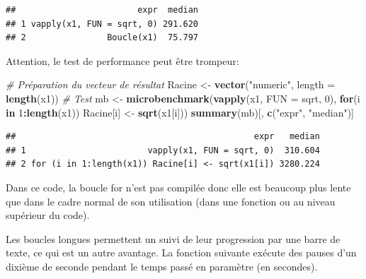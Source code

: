 \documentclass[
  12pt,
  french,
  a4paper,
  extrafontsizes,onecolumn,openright
  ]{memoir}
\newenvironment{Shaded}{\begin{snugshade}}{\end{snugshade}}
\newcommand{\CommentTok}[1]{\textcolor[rgb]{0.56,0.35,0.01}{\textit{#1}}}
\newcommand{\ControlFlowTok}[1]{\textcolor[rgb]{0.13,0.29,0.53}{\textbf{#1}}}
\newcommand{\DataTypeTok}[1]{\textcolor[rgb]{0.13,0.29,0.53}{#1}}
\newcommand{\DecValTok}[1]{\textcolor[rgb]{0.00,0.00,0.81}{#1}}
\newcommand{\KeywordTok}[1]{\textcolor[rgb]{0.13,0.29,0.53}{\textbf{#1}}}
\newcommand{\NormalTok}[1]{#1}
\newcommand{\OperatorTok}[1]{\textcolor[rgb]{0.81,0.36,0.00}{\textbf{#1}}}
\newcommand{\StringTok}[1]{\textcolor[rgb]{0.31,0.60,0.02}{#1}}
\newlength{\rf}
\begin{document}
\begin{verbatim}
##                        expr  median
## 1 vapply(x1, FUN = sqrt, 0) 291.620
## 2                Boucle(x1)  75.797
\end{verbatim}

\normalsize

Attention, le test de performance peut être trompeur:

\scriptsize

\begin{Shaded}
\begin{Highlighting}[]
\CommentTok{# Préparation du vecteur de résultat}
\NormalTok{Racine <-}\StringTok{ }\KeywordTok{vector}\NormalTok{(}\StringTok{"numeric"}\NormalTok{, }\DataTypeTok{length =} \KeywordTok{length}\NormalTok{(x1))}
\CommentTok{# Test}
\NormalTok{mb <-}\StringTok{ }\KeywordTok{microbenchmark}\NormalTok{(}\KeywordTok{vapply}\NormalTok{(x1, }\DataTypeTok{FUN =}\NormalTok{ sqrt, }\DecValTok{0}\NormalTok{), }
                     \ControlFlowTok{for}\NormalTok{(i }\ControlFlowTok{in} \DecValTok{1}\OperatorTok{:}\KeywordTok{length}\NormalTok{(x1)) }
\NormalTok{                       Racine[i] <-}\StringTok{ }\KeywordTok{sqrt}\NormalTok{(x1[i]))}
\KeywordTok{summary}\NormalTok{(mb)[, }\KeywordTok{c}\NormalTok{(}\StringTok{"expr"}\NormalTok{, }\StringTok{"median"}\NormalTok{)]}
\end{Highlighting}
\end{Shaded}

\begin{verbatim}
##                                               expr   median
## 1                        vapply(x1, FUN = sqrt, 0)  310.604
## 2 for (i in 1:length(x1)) Racine[i] <- sqrt(x1[i]) 3280.224
\end{verbatim}

\normalsize

Dans ce code, la boucle for n'est pas compilée donc elle est beaucoup plus lente que dans le cadre normal de son utilisation (dans une fonction ou au niveau supérieur du code).

Les boucles longues permettent un suivi de leur progression par une barre de texte, ce qui est un autre avantage.
La fonction suivante exécute des pauses d'un dixième de seconde pendant le temps passé en paramètre (en secondes).

\scriptsize
\end{document}
